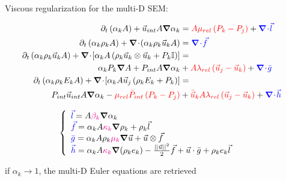 \documentclass[xcolor=dvipsnames,10pt]{beamer}
\renewcommand{\div}{\boldsymbol{\nabla}\! \cdot \!}
\newcommand{\grad}{\boldsymbol{\nabla}}
\begin{document}
\begin{frame}{Viscous regularization for the multi-D SEM:}
\begin{block}{}
\begin{align}
\partial_t \left( \alpha_k  A\right) + \vec{u}_{int} A \grad \alpha_k &= {\color{red}A \mu_{rel} \left( P_k - P_j \right)} + {\color{blue}\div \vec{l}} & \nonumber \\
\partial_t \left( \alpha_k \rho_k A \right) + \div \left( \alpha_k \rho_k \vec{u}_k A \right) &= {\color{blue}\div \vec{f}} \nonumber \\
\partial_t \left( \alpha_k \rho_k \vec{u}_k A \right) + \div \left[ \alpha_k A \left( \rho_k \vec{u}_k\otimes \vec{u}_k + P_k\mathbb{I}\right) \right] &=  \nonumber \\
\alpha_k P_k \grad A +  P_{int} A \grad \alpha_k &+  {\color{red}A \lambda_{rel} \left( \vec{u}_j - \vec{u}_k \right)} +{\color{blue}\div \bar{g}}\nonumber \\
\partial_t \left( \alpha_k \rho_k E_k A \right) + \div \left[ \alpha_k A \vec{u}_j \left( \rho_k E_k + P_k \right) \right] &= \nonumber \\
P_{int} \vec{u}_{int} A \grad \alpha_k - {\color{red}\mu_{rel} \bar{P}_{int} \left( P_k-P_j \right)} &+{\color{red}\bar{\vec{u}}_kA \lambda_{rel} \left( \vec{u}_j - \vec{u}_k \right)} + {\color{blue}\div \vec{h}} \nonumber
\end{align}
\end{block}
\begin{block}{}
\begin{equation}
\left\{
\begin{array}{lcl}
{\color{blue}\vec{l}} = A {\color{magenta}\beta_k} \grad \alpha_k & & \\
{\color{blue}\vec{f}} = \alpha_k A {\color{magenta}\kappa_k}  \grad \rho_k + \rho_k \vec{l}& & \\
{\color{blue}\bar{g}} = \alpha_k A \rho_k {\color{magenta}\mu_k} \grad \vec{u} + \vec{u} \otimes \vec{f} & & \\
{\color{blue}\vec{h}} = \alpha_k A {\color{magenta}\kappa_k} \grad(\rho_k e_k) - \frac{||\vec{u}||^2}{2} \vec{f} + \vec{u} \cdot \bar{g} + \rho_k e_k \vec{l} & &
\end{array}
\right.
\nonumber
\end{equation}
\end{block}
if $\alpha_k \to 1$, the multi-D Euler equations are retrieved
\end{frame}
\end{document}
